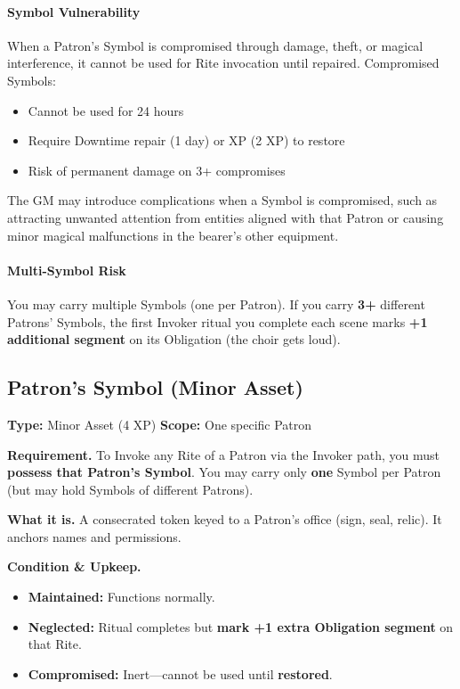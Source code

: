 \documentclass[12pt,twoside]{book}
\begin{document}
\paragraph*{Symbol Vulnerability }

When a Patron's Symbol is compromised through damage, theft, or magical interference, it cannot be used for Rite invocation until repaired. Compromised Symbols:
\begin{itemize}
\item Cannot be used for 24 hours
\item Require Downtime repair (1 day) or XP (2 XP) to restore
\item Risk of permanent damage on 3+ compromises
\end{itemize}

The GM may introduce complications when a Symbol is compromised, such as attracting unwanted attention from entities aligned with that Patron or causing minor magical malfunctions in the bearer's other equipment.

\paragraph{Multi-Symbol Risk}
You may carry multiple Symbols (one per Patron). If you carry \textbf{3+} different Patrons' Symbols, the first Invoker ritual you complete each scene marks \textbf{+1 additional segment} on its Obligation (the choir gets loud).

\subsection*{Patron's Symbol (Minor Asset)}

\textbf{Type:} Minor Asset (4 XP) \hfill \textbf{Scope:} One specific Patron

\textbf{Requirement.} To Invoke any Rite of a Patron via the Invoker path, you must \textbf{possess that Patron's Symbol}. You may carry only \textbf{one} Symbol per Patron (but may hold Symbols of different Patrons).

\textbf{What it is.} A consecrated token keyed to a Patron's office (sign, seal, relic). It anchors names and permissions.

\textbf{Condition \& Upkeep.}
\begin{itemize}
  \item \textbf{Maintained:} Functions normally.
  \item \textbf{Neglected:} Ritual completes but \textbf{mark +1 extra Obligation segment} on that Rite.
  \item \textbf{Compromised:} Inert—cannot be used until \textbf{restored}.
\end{itemize}
\end{document}
